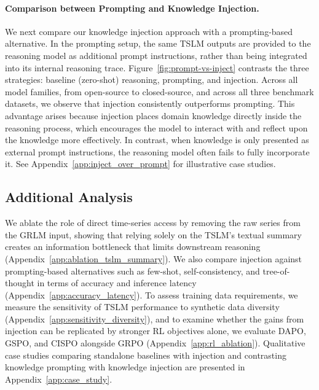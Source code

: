 \documentclass[twoside]{article}
\begin{document}
\paragraph{Comparison between Prompting and Knowledge Injection.} We next compare our knowledge injection approach with a prompting-based alternative. In the prompting setup, the same TSLM outputs are provided to the reasoning model as additional prompt instructions, rather than being integrated into its internal reasoning trace. Figure~\ref{fig:prompt-vs-inject} contrasts the three strategies: baseline (zero-shot) reasoning, prompting, and injection. Across all model families, from open-source to closed-source, and across all three benchmark datasets, we observe that injection consistently outperforms prompting. This advantage arises because injection places domain knowledge directly inside the reasoning process, which encourages the model to interact with and reflect upon the knowledge more effectively. In contrast, when knowledge is only presented as external prompt instructions, the reasoning model often fails to fully incorporate it. See Appendix~\ref{app:inject_over_prompt} for illustrative case studies.

\subsection{Additional Analysis}
We ablate the role of direct time-series access by removing the raw series from the GRLM input, showing that relying solely on the TSLM’s textual summary creates an information bottleneck that limits downstream reasoning (Appendix~\ref{app:ablation_tslm_summary}). We also compare injection against prompting-based alternatives such as few-shot, self-consistency, and tree-of-thought in terms of accuracy and inference latency (Appendix~\ref{app:accuracy_latency}). To assess training data requirements, we measure the sensitivity of TSLM performance to synthetic data diversity (Appendix~\ref{app:sensitivity_diversity}), and to examine whether the gains from injection can be replicated by stronger RL objectives alone, we evaluate DAPO, GSPO, and CISPO alongside GRPO (Appendix~\ref{app:rl_ablation}). Qualitative case studies comparing standalone baselines with injection and contrasting knowledge prompting with knowledge injection are presented in Appendix~\ref{app:case_study}.
\end{document}
